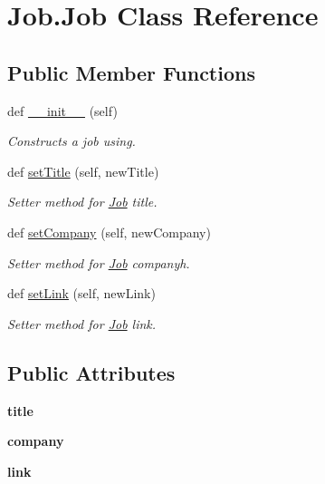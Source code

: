 \hypertarget{classJob_1_1Job}{}\section{Job.\+Job Class Reference}
\label{classJob_1_1Job}
\subsection*{Public Member Functions}
\begin{DoxyCompactItemize}
\item 
def \hyperlink{classJob_1_1Job_a3fcc30f8e2d9302e6246adf71cd05ac0}{\+\_\+\+\_\+init\+\_\+\+\_\+} (self)
\begin{DoxyCompactList}\small\item\em Constructs a job using. \end{DoxyCompactList}\item 
def \hyperlink{classJob_1_1Job_ac7a9711243e3183bc887fb6731feb153}{set\+Title} (self, new\+Title)
\begin{DoxyCompactList}\small\item\em Setter method for \hyperlink{classJob_1_1Job}{Job} title. \end{DoxyCompactList}\item 
def \hyperlink{classJob_1_1Job_ac6ded254e222637426d4d5a01db56e21}{set\+Company} (self, new\+Company)
\begin{DoxyCompactList}\small\item\em Setter method for \hyperlink{classJob_1_1Job}{Job} companyh. \end{DoxyCompactList}\item 
def \hyperlink{classJob_1_1Job_a2dc788d81d886501bb544aaadb468022}{set\+Link} (self, new\+Link)
\begin{DoxyCompactList}\small\item\em Setter method for \hyperlink{classJob_1_1Job}{Job} link. \end{DoxyCompactList}\end{DoxyCompactItemize}
\subsection*{Public Attributes}
\begin{DoxyCompactItemize}
\item 
\mbox{\label{classJob_1_1Job_a18e1276bcd99f7c53d90c81333ca8084}} 
{\bfseries title}
\item 
\mbox{\label{classJob_1_1Job_a49a7564b5383b0f98752654e4cf84097}} 
{\bfseries company}
\item 
\mbox{\label{classJob_1_1Job_acc97bbf6e1dd850227168733d210f2af}} 
{\bfseries link}
\end{DoxyCompactItemize}
